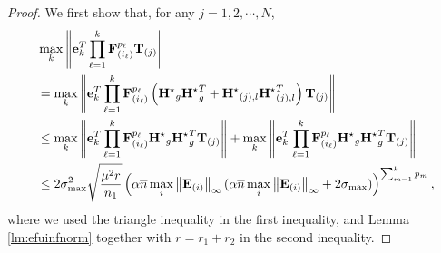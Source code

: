 \documentclass[twoside,11pt]{article}
\newcommand{\norm}[1]{\left\lVert#1\right\rVert}
\newcommand{\matE}{\mathbf{E}}
\newcommand{\matF}{\mathbf{F}}
\newcommand{\matHst}{{\mathbf{H}^\star}}
\newcommand{\matT}{\mathbf{T}}
\newcommand{\vece}{\mathbf{e}}
\newcommand{\gop}{\sigma_{\max}}
\newcommand{\bn}{{\overline{n}}}
\newcommand{\abnb}{\alpha \bn\max_{i}\norm{\matE_{(i)}}_{\infty}}
\begin{document}
\begin{proof}
We first show that, for any $j=1,2,\cdots,N$,
\begin{align}
&\max_k\norm{\vece_k^T\prod_{\ell=1}^k\matF_{(i_{\ell})}^{p_{\ell}}\matT_{(j)}}\notag\\
&= \max_k\norm{\vece_k^T\prod_{\ell=1}^k\matF_{(i_{\ell})}^{p_{\ell}}\left(\matHst_g\matHst_g^T+\matHst_{(j),l}\matHst_{(j),l}^T\right)\matT_{(j)}}\notag\\
&\le \max_k\norm{\vece_k^T\prod_{\ell=1}^k\matF_{(i_{\ell})}^{p_{\ell}}\matHst_g\matHst_g^T\matT_{(j)}}+\max_k\norm{\vece_k^T\prod_{\ell=1}^k\matF_{(i_{\ell})}^{p_{\ell}}\matHst_g\matHst_g^T\matT_{(j)}}\notag\\
&\le 
2\gop^2\sqrt{\frac{\mu^2 r}{n_1}}\left(\abnb (\abnb+2\gop)\right)^{\sum_{m=1}^kp_m},\notag\\
\label{eqn:eftjinfnorm}
\end{align}
where we used the triangle inequality in the first inequality, and Lemma \ref{lm:efuinfnorm} together with $r=r_1+r_2$ in the second inequality.


\end{proof}
\end{document}
